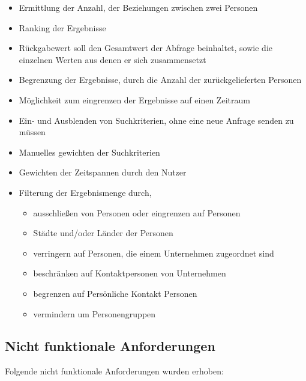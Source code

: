 \begin{itemize}
\item Ermittlung der Anzahl, der Beziehungen zwischen zwei Personen

\item Ranking der Ergebnisse

\item Rückgabewert soll den Gesamtwert der Abfrage beinhaltet, sowie die einzelnen Werten aus denen er sich zusammensetzt

\item Begrenzung der Ergebnisse, durch die Anzahl der zurückgelieferten Personen

\item Möglichkeit zum eingrenzen der Ergebnisse auf einen Zeitraum

\item Ein- und Ausblenden von Suchkriterien, ohne eine neue Anfrage senden zu müssen

\item Manuelles gewichten der Suchkriterien

\item Gewichten der Zeitspannen durch den Nutzer

\item Filterung der Ergebnismenge durch,	
	\begin{itemize}
	\item ausschließen von Personen oder eingrenzen auf Personen
	\item Städte und/oder Länder der Personen
	\item verringern auf Personen, die einem Unternehmen zugeordnet sind 
	\item beschränken auf Kontaktpersonen von Unternehmen
	\item begrenzen auf Persönliche Kontakt Personen
	\item vermindern um Personengruppen
	\end{itemize}
\end{itemize}

\subsection{Nicht funktionale Anforderungen}

Folgende nicht funktionale Anforderungen wurden erhoben:

